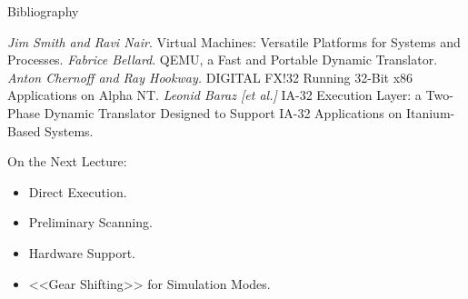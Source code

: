 \begin{frame}[allowframebreaks]{Bibliography}
\begin{thebibliography}{99}
  \bibitem{} \textit{Jim Smith and Ravi Nair}. Virtual Machines: Versatile
  Platforms for Systems and Processes.
  \bibitem{} \textit{Fabrice Bellard}. QEMU, a Fast and Portable Dynamic
  Translator.
  \bibitem{} \textit{Anton Chernoff and Ray Hookway.} {DIGITAL FX!32} Running
  32-Bit x86 Applications on {Alpha} {NT}.
  \bibitem{} \textit{Leonid Baraz [et al.]} IA-32 Execution Layer: a Two-Phase
  Dynamic Translator Designed to Support IA-32 Applications on
  Itanium\reg-Based Systems.
\end{thebibliography}
\end{frame}

\begin{frame}{On the Next Lecture:}
\begin{itemize}
\item Direct Execution.
\item Preliminary Scanning.
\item Hardware Support.
\item{<<Gear Shifting>> for Simulation Modes.}
\end{itemize}
\end{frame}

\finalslide



